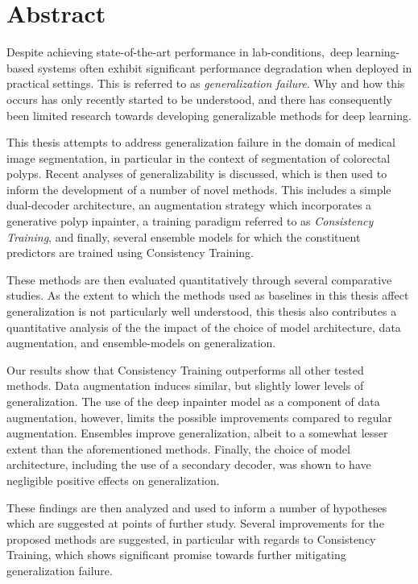 \chapter*{Abstract}
    Despite achieving state-of-the-art performance in lab-conditions, deep learning-based systems often exhibit significant performance degradation when deployed in practical settings. This is referred to as \textit{generalization failure}. Why and how this occurs has only recently started to be understood, and there has consequently been limited research towards developing generalizable methods for deep learning. 
    
    This thesis attempts to address generalization failure in the domain of medical image segmentation, in particular in the context of  segmentation of colorectal polyps. Recent analyses of generalizability is discussed, which is then used to inform the development of a number of novel methods. This includes a simple dual-decoder architecture, an augmentation strategy which incorporates a generative polyp inpainter, a training paradigm referred to as \textit{Consistency Training}, and finally, several ensemble models for which the constituent predictors are trained using Consistency Training.
    
    These methods are then evaluated quantitatively through several comparative studies. As the extent to which the methods used as baselines in this thesis affect generalization is not particularly well understood, this thesis also contributes a quantitative analysis of the the impact of the choice of model architecture, data augmentation, and ensemble-models on generalization. 
    
    Our results show that Consistency Training outperforms all other tested methods. Data augmentation induces similar, but slightly lower levels of generalization. The use of the deep inpainter model as a component of data augmentation, however, limits the possible improvements compared to regular augmentation. Ensembles improve generalization, albeit to a somewhat lesser extent than the aforementioned methods. Finally, the choice of model architecture, including the use of a secondary decoder, was shown to have negligible positive effects on generalization. 
    
    These findings are then analyzed and used to inform a number of hypotheses which are suggested at points of further study. Several improvements for the proposed methods are suggested, in particular with regards to Consistency Training, which shows significant promise towards further mitigating generalization failure. 